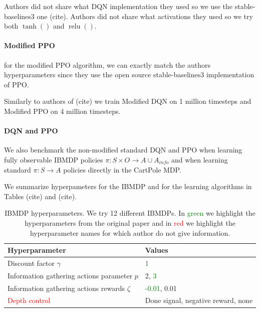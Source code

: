 Authors did not share what DQN implementation they used so we use the stable-baselines3 one (cite).
Authors did not share what activations they used so we try both $\operatorname{tanh}()$ and $\operatorname{relu}()$. 

\paragraph{Modified PPO} for the modified PPO algorithm, we can exactly match the authors hyperparameters since they use the open source stable-baselines3 implementation of PPO.

Similarly to authors of (cite) we train Modified DQN on 1 million timesteps and Modified PPO on 4 million timesteps.

\paragraph{DQN and PPO} We also benchmark the non-modified standard DQN and PPO when learning fully observable IBMDP policies $\pi:S\times O\rightarrow A\cup A_{info}$ and when learning standard $\pi:S\rightarrow A$ policies directly in the CartPole MDP.

We summarize hyperpameters for the IBMDP and for the learning algorithms in Tables (cite) and (cite).

\begin{table}[h]
    \centering
    \caption{IBMDP hyperparameters. We try 12 different IBMDPs. In \textcolor{green}{green} we highlight the hyperparameters from the original paper and in \textcolor{red}{red} we highlight the hyperparameter names for which author do not give information.}
    \begin{tabular}{ll}
    \toprule
    \textbf{Hyperparameter} & \textbf{Values}\\
    \midrule
    Discount factor $\gamma$ & \textcolor{green}{1} \\
    Information gathering actions parameter $p$ & 2, \textcolor{green}{3} \\
    Information gathering actions rewards $\zeta$ & \textcolor{green}{-0.01}, 0.01 \\
    \textcolor{red}{Depth control} & Done signal, negative reward, none \\ 
    \bottomrule
    \end{tabular}
    \end{table}

